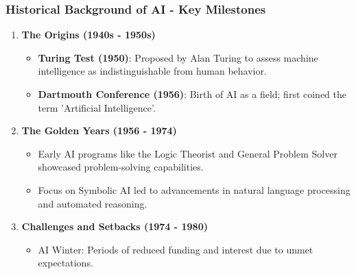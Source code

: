 \documentclass{beamer}
\begin{document}
\begin{frame}[fragile]
    \frametitle{Historical Background of AI - Key Milestones}
    \begin{enumerate}
        \item \textbf{The Origins (1940s - 1950s)}
            \begin{itemize}
                \item \textbf{Turing Test (1950)}: Proposed by Alan Turing to assess machine intelligence as indistinguishable from human behavior.
                \item \textbf{Dartmouth Conference (1956)}: Birth of AI as a field; first coined the term 'Artificial Intelligence'.
            \end{itemize}
        
        \item \textbf{The Golden Years (1956 - 1974)}
            \begin{itemize}
                \item Early AI programs like the Logic Theorist and General Problem Solver showcased problem-solving capabilities.
                \item Focus on Symbolic AI led to advancements in natural language processing and automated reasoning.
            \end{itemize}
        
        \item \textbf{Challenges and Setbacks (1974 - 1980)}
            \begin{itemize}
                \item AI Winter: Periods of reduced funding and interest due to unmet expectations.
            \end{itemize}
    \end{enumerate}
\end{frame}
\end{document}
